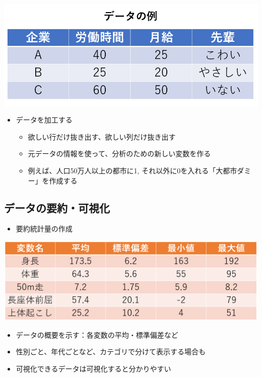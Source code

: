 \documentclass[
]{ltjsarticle}
\providecommand{\tightlist}{%
  \setlength{\itemsep}{0pt}\setlength{\parskip}{0pt}}
\begin{document}
\begin{center}\includegraphics[width=0.7\linewidth]{figs/data_rei} \end{center}

\begin{itemize}
\item
  データを加工する

  \begin{itemize}
  \tightlist
  \item
    欲しい行だけ抜き出す、欲しい列だけ抜き出す
  \item
    元データの情報を使って、分析のための新しい変数を作る
  \item
    例えば、人口50万人以上の都市に1,
    それ以外に0を入れる「大都市ダミー」を作成する
  \end{itemize}
\end{itemize}

\hypertarget{ux30c7ux30fcux30bfux306eux8981ux7d04ux53efux8996ux5316}{%
\subsection{データの要約・可視化}\label{ux30c7ux30fcux30bfux306eux8981ux7d04ux53efux8996ux5316}}

\begin{itemize}
\tightlist
\item
  要約統計量の作成
\end{itemize}

\begin{center}\includegraphics[width=0.8\linewidth]{figs/summary_ex} \end{center}

\begin{itemize}
\tightlist
\item
  データの概要を示す：各変数の平均・標準偏差など
\item
  性別ごと、年代ごとなど、カテゴリで分けて表示する場合も
\item
  可視化できるデータは可視化すると分かりやすい
\end{itemize}
\end{document}
